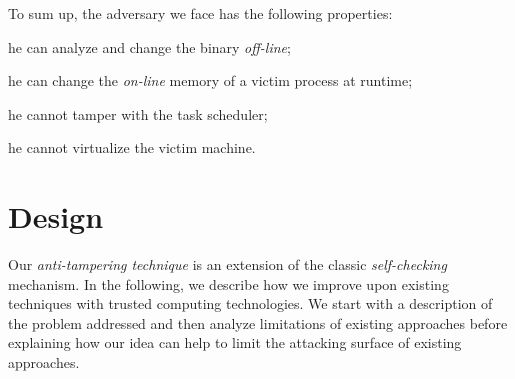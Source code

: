To sum up, the adversary we face has the following properties:
\begin{enumerate*}[label=(\roman*)]
	\item he can analyze and change the binary \emph{off-line};
	\item he can change the \emph{on-line} memory of a victim process at 
	runtime;
	\item he cannot tamper with the task scheduler;
	\item he cannot virtualize the victim machine.
\end{enumerate*}

\section{Design}
\label{sec:approach}

Our \emph{anti-tampering technique} is an extension of the classic 
\emph{self-checking}
mechanism. In the following, we describe how we improve upon existing 
techniques with trusted computing technologies. We start with a description of 
the problem addressed and then analyze
limitations of existing approaches before explaining how our idea can help to 
limit the attacking surface of existing approaches.

